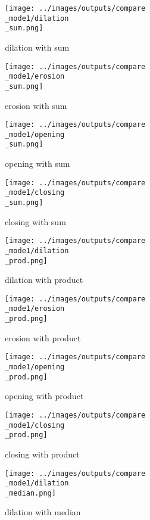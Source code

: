 \begin{figure}[!ht]
   \centering
\begin{subfigure}[t]{0.22\textwidth}
    \texttt{[image: ../images/outputs/compare\\\_mode1/dilation\\\_sum.png]}
    \caption{dilation with sum}
    \centering
  \end{subfigure}
\begin{subfigure}[t]{0.22\textwidth}
    \texttt{[image: ../images/outputs/compare\\\_mode1/erosion\\\_sum.png]}
    \caption{erosion with sum}
    \centering
  \end{subfigure}
\begin{subfigure}[t]{0.22\textwidth}
    \texttt{[image: ../images/outputs/compare\\\_mode1/opening\\\_sum.png]}
    \caption{opening with sum}
    \centering
  \end{subfigure}
\begin{subfigure}[t]{0.22\textwidth}
    \texttt{[image: ../images/outputs/compare\\\_mode1/closing\\\_sum.png]}
    \caption{closing with sum}
    \centering
  \end{subfigure}
\begin{subfigure}[t]{0.22\textwidth}
    \texttt{[image: ../images/outputs/compare\\\_mode1/dilation\\\_prod.png]}
    \caption{dilation with product}
    \centering
  \end{subfigure}
\begin{subfigure}[t]{0.22\textwidth}
    \texttt{[image: ../images/outputs/compare\\\_mode1/erosion\\\_prod.png]}
    \caption{erosion with product}
    \centering
  \end{subfigure}
\begin{subfigure}[t]{0.22\textwidth}
    \texttt{[image: ../images/outputs/compare\\\_mode1/opening\\\_prod.png]}
    \caption{opening with product}
    \centering
  \end{subfigure}
\begin{subfigure}[t]{0.22\textwidth}
    \texttt{[image: ../images/outputs/compare\\\_mode1/closing\\\_prod.png]}
    \caption{closing with product}
    \centering
  \end{subfigure}
\begin{subfigure}[t]{0.22\textwidth}
    \texttt{[image: ../images/outputs/compare\\\_mode1/dilation\\\_median.png]}
    \caption{dilation with median}
    \centering
  \end{subfigure}
\begin{subfigure}[t]{0.22\textwidth}

\end{subfigure}
\end{figure}
